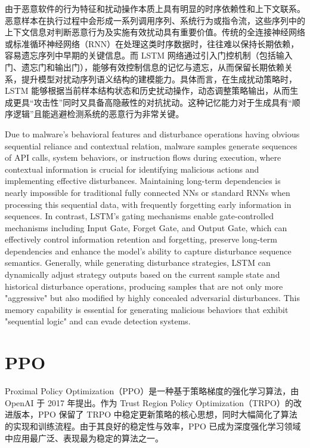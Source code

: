 由于恶意软件的行为特征和扰动操作本质上具有明显的时序依赖性和上下文联系。恶意样本在执行过程中会形成一系列调用序列、系统行为或指令流，这些序列中的上下文信息对判断恶意行为及实施有效扰动具有重要价值。传统的全连接神经网络或标准循环神经网络（RNN）在处理这类时序数据时，往往难以保持长期依赖，容易遗忘序列中早期的关键信息。而 LSTM 网络通过引入门控机制（包括输入门、遗忘门和输出门），能够有效控制信息的记忆与遗忘，从而保留长期依赖关系，提升模型对扰动序列语义结构的建模能力。具体而言，在生成扰动策略时，LSTM 能够根据当前样本结构状态和历史扰动操作，动态调整策略输出，从而生成更具“攻击性”同时又具备高隐蔽性的对抗扰动。这种记忆能力对于生成具有“顺序逻辑”且能逃避检测系统的恶意行为非常关键。

Due to malware's behavioral features and disturbance operations having obvious sequential reliance and contextual relation, malware samples generate sequences of API calls, system behaviors, or instruction flows during execution, where contextual information is crucial for identifying malicious actions and implementing effective disturbances. Maintaining long-term dependencies is nearly impossible for traditional fully connected NNs or standard RNNs when processing this sequential data, with frequently forgetting early information in sequences. In contrast, LSTM's gating mechanisms enable gate-controlled mechanisms including Input Gate, Forget Gate, and Output Gate, which can effectively control information retention and forgetting, preserve long-term dependencies and enhance the model's ability to capture disturbance sequence semantics. Generally, while generating disturbance strategies, LSTM can dynamically adjust strategy outputs based on the current sample state and historical disturbance operations, producing samples that are not only more "aggressive" but also modified by highly concealed adversarial disturbances. This memory capability is essential for generating malicious behaviors that exhibit "sequential logic" and can evade detection systems.

\section{PPO}

Proximal Policy Optimization（PPO）\cite{yu2022surprising}是一种基于策略梯度的强化学习算法，由 OpenAI 于 2017 年提出。作为 Trust Region Policy Optimization（TRPO）的改进版本，PPO 保留了 TRPO 中稳定更新策略的核心思想，同时大幅简化了算法的实现和训练流程。由于其良好的稳定性与效率，PPO 已成为深度强化学习领域中应用最广泛、表现最为稳定的算法之一。

